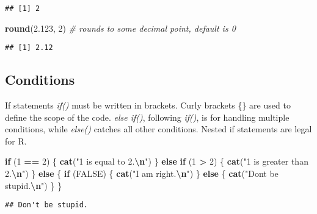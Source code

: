 \documentclass[
  12pt,
]{article}
\newenvironment{Shaded}{\begin{snugshade}}{\end{snugshade}}
\newcommand{\CommentTok}[1]{\textcolor[rgb]{0.56,0.35,0.01}{\textit{#1}}}
\newcommand{\ConstantTok}[1]{\textcolor[rgb]{0.56,0.35,0.01}{#1}}
\newcommand{\ControlFlowTok}[1]{\textcolor[rgb]{0.13,0.29,0.53}{\textbf{#1}}}
\newcommand{\DecValTok}[1]{\textcolor[rgb]{0.00,0.00,0.81}{#1}}
\newcommand{\FloatTok}[1]{\textcolor[rgb]{0.00,0.00,0.81}{#1}}
\newcommand{\FunctionTok}[1]{\textcolor[rgb]{0.13,0.29,0.53}{\textbf{#1}}}
\newcommand{\NormalTok}[1]{#1}
\newcommand{\SpecialCharTok}[1]{\textcolor[rgb]{0.81,0.36,0.00}{\textbf{#1}}}
\newcommand{\StringTok}[1]{\textcolor[rgb]{0.31,0.60,0.02}{#1}}
\begin{document}
\begin{verbatim}
## [1] 2
\end{verbatim}

\begin{Shaded}
\begin{Highlighting}[]
\FunctionTok{round}\NormalTok{(}\FloatTok{2.123}\NormalTok{, }\DecValTok{2}\NormalTok{) }\CommentTok{\# rounds to some decimal point, default is 0}
\end{Highlighting}
\end{Shaded}

\begin{verbatim}
## [1] 2.12
\end{verbatim}

\newpage
\subsection{Conditions}
\label{sec:BRS-condition}

If statements \textit{if()} must be written in brackets. Curly brackets
\{\} are used to define the scope of the code. \textit{else if()},
following \textit{if()}, is for handling multiple conditions, while
\textit{else()} catches all other conditions. Nested if statements are
legal for R.

\begin{Shaded}
\begin{Highlighting}[]
\ControlFlowTok{if}\NormalTok{ (}\DecValTok{1} \SpecialCharTok{==} \DecValTok{2}\NormalTok{) \{}
  \FunctionTok{cat}\NormalTok{(}\StringTok{"1 is equal to 2.}\SpecialCharTok{\textbackslash{}n}\StringTok{"}\NormalTok{)}
\NormalTok{\} }\ControlFlowTok{else} \ControlFlowTok{if}\NormalTok{ (}\DecValTok{1} \SpecialCharTok{\textgreater{}} \DecValTok{2}\NormalTok{) \{}
  \FunctionTok{cat}\NormalTok{(}\StringTok{"1 is greater than 2.}\SpecialCharTok{\textbackslash{}n}\StringTok{"}\NormalTok{)}
\NormalTok{\} }\ControlFlowTok{else}\NormalTok{ \{}
  \ControlFlowTok{if}\NormalTok{ (}\ConstantTok{FALSE}\NormalTok{) \{}
    \FunctionTok{cat}\NormalTok{(}\StringTok{"I am right.}\SpecialCharTok{\textbackslash{}n}\StringTok{"}\NormalTok{)}
\NormalTok{  \} }\ControlFlowTok{else}\NormalTok{ \{}
    \FunctionTok{cat}\NormalTok{(}\StringTok{"Don\textquotesingle{}t be stupid.}\SpecialCharTok{\textbackslash{}n}\StringTok{"}\NormalTok{)}
\NormalTok{  \}}
\NormalTok{\}}
\end{Highlighting}
\end{Shaded}

\begin{verbatim}
## Don't be stupid.
\end{verbatim}
\end{document}
